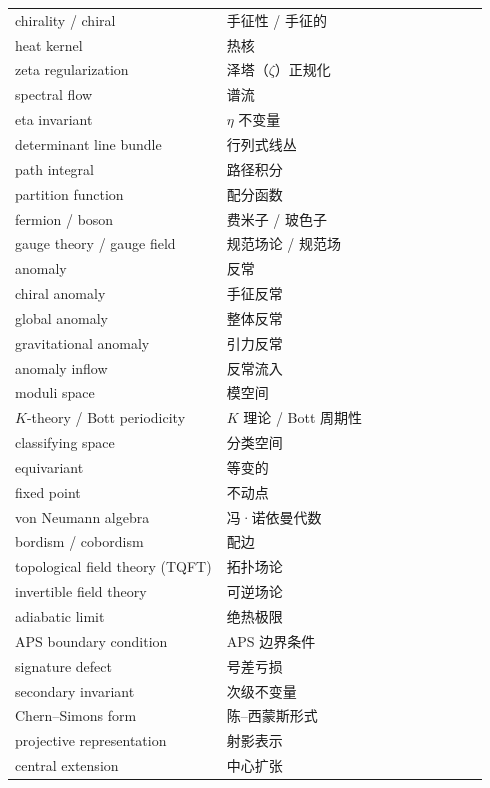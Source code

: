 \documentclass[11pt]{amsart}
\theoremstyle{definition}
\theoremstyle{remark}
\theoremstyle{plain}
\numberwithin{equation}{section}
\renewcommand{\:}{\colon}
\begin{document}
\begin{longtable}{@{}p{0.42\linewidth}p{0.52\linewidth}@{}}
chirality / chiral & 手征性 / 手征的\\
heat kernel & 热核\\
zeta regularization & 泽塔（$\zeta$）正规化\\
spectral flow & 谱流\\
eta invariant & $\eta$ 不变量\\
determinant line bundle & 行列式线丛\\
path integral & 路径积分\\
partition function & 配分函数\\
fermion / boson & 费米子 / 玻色子\\
gauge theory / gauge field & 规范场论 / 规范场\\
anomaly & 反常\\
chiral anomaly & 手征反常\\
global anomaly & 整体反常\\
gravitational anomaly & 引力反常\\
anomaly inflow & 反常流入\\
moduli space & 模空间\\
$K$-theory / Bott periodicity & $K$ 理论 / Bott 周期性\\
classifying space & 分类空间\\
equivariant & 等变的\\
fixed point & 不动点\\
von Neumann algebra & 冯·诺依曼代数\\
bordism / cobordism & 配边\\
topological field theory (TQFT) & 拓扑场论\\
invertible field theory & 可逆场论\\
adiabatic limit & 绝热极限\\
APS boundary condition & APS 边界条件\\
signature defect & 号差亏损\\
secondary invariant & 次级不变量\\
Chern--Simons form & 陈--西蒙斯形式\\
projective representation & 射影表示\\
central extension & 中心扩张\\
\bottomrule\end{longtable}
\end{document}
